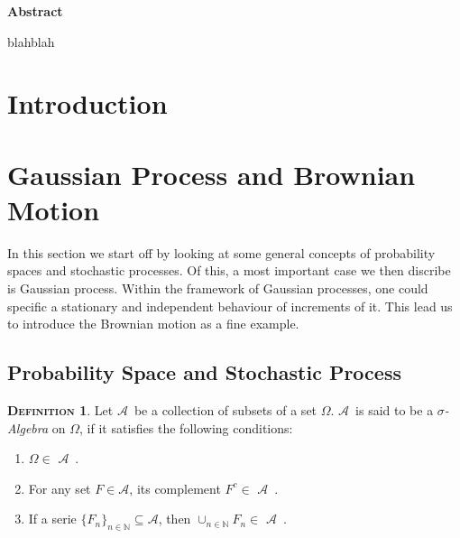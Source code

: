 \documentclass[a4paper, twoside, 11pt]{article}
\theoremstyle{definition}
\newtheorem{definition}{\scshape Definition}[section]
\def\AA{$\mathscr{A}$\ }
\newcommand{\compl}[1]{{#1}^{c}}
\renewenvironment{abstract}{
	\begin{center}
		  \Large
		  \textbf{Abstract}
		  \hspace{2em}
	\end{center}				
  }{}
\begin{document}
  
  \newpage

  \thispagestyle{empty}
  \begin{abstract}
	blahblah
  \end{abstract}
\newpage

\thispagestyle{empty}
\mbox{}
\newpage
\fancyhead[LO, RE]{}
\fancyfoot[LE, RO]{}
\tableofcontents
\newpage
\thispagestyle{empty}
\mbox{}
\newpage

\fancyhead[RO]{\leftmark}
\fancyhead[LE]{\rightmark}
\fancyfoot[LE, RO]{\large \thepage}
\setcounter{section}{0}
\setcounter{page}{1}
\section{Introduction}

\newpage

\section{Gaussian Process and Brownian Motion}
In this section we start off by looking at some general concepts of probability spaces and stochastic processes. Of this, a most important case we then discribe is Gaussian process. Within the framework of Gaussian processes, one could specific a stationary and independent behaviour of increments of it. This lead us to introduce the Brownian motion as a fine example.

\subsection{Probability Space and Stochastic Process }
\begin{definition}
  Let \AA be a collection of subsets of a set $\Omega$. \AA is said to be a \emph{$\sigma$- Algebra} on $\Omega$, if it satisfies the following conditions:
  \begin{enumerate}[topsep=0pt, itemsep=-1ex, partopsep=1ex, parsep=1ex, label=(\roman*)]
	\item $\Omega \in $ \AA.
	\item For any set $F \in \mathscr{A}$, its complement $\compl{F} \in$ \AA.
	\item If a serie $\{F_n\}_{n \in \mathbb{N}} \subseteq \mathscr{A}$, then $\cup_{n \in \mathbb{N}}F_n \in $ \AA.
  \end{enumerate}
\end{definition}
\end{document}
